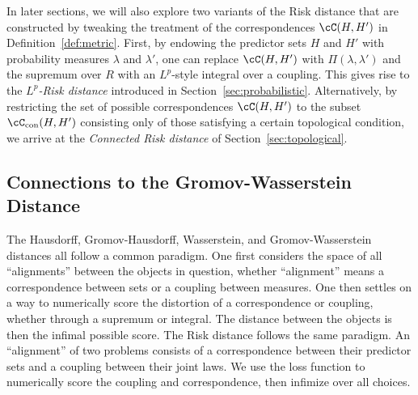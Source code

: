 \documentclass[twoside,11pt]{article}
\newcommand{\con}{\cC_{\mathrm{con}}}%
\begin{document}
In later sections, we will also explore two variants of the Risk distance that are constructed by tweaking the treatment of the correspondences $\cC(H,H')$ in Definition~\ref{def:metric}. First, by endowing the predictor sets $H$ and $H'$ with probability measures $\lambda$ and $\lambda'$, one can replace $\cC(H,H')$ with $\Pi(\lambda,\lambda')$ and the supremum over $R$ with an $L^p$-style integral over a coupling. This gives rise to the \emph{$L^p$-Risk distance} introduced in Section~\ref{sec:probabilistic}. Alternatively, by restricting the set of possible correspondences $\cC(H,H')$ to the subset $\con(H,H')$ consisting only of those satisfying a certain topological condition, we arrive at the \emph{Connected Risk distance} of Section~\ref{sec:topological}.

\subsection{Connections to the Gromov-Wasserstein Distance}\label{subsec:OT-connection}
    The Hausdorff, Gromov-Hausdorff, Wasserstein, and Gromov-Wasserstein distances all follow a common paradigm. One first considers the space of all ``alignments'' between the objects in question, whether ``alignment'' means a correspondence between sets or a coupling between measures. One then settles on a way to numerically score the distortion of a correspondence or coupling, whether through a supremum or integral. The distance between the objects is then the infimal possible score. The Risk distance follows the same paradigm. An ``alignment'' of two problems consists of a correspondence between their predictor sets and a coupling between their joint laws. We use the loss function to numerically score the coupling and correspondence, then infimize over all choices. 
    
\end{document}
